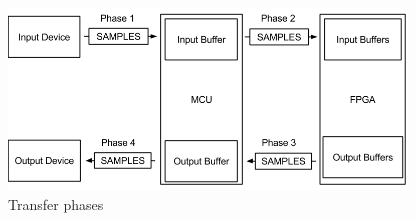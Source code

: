 \begin{figure}[H]
	\centerline{
	\includegraphics[width=400px]{figures/sw/transfer-phases.png}}
	\caption{Transfer phases}
	\label{fig:sw_transfer_phases}
\end{figure}
\FloatBarrier
